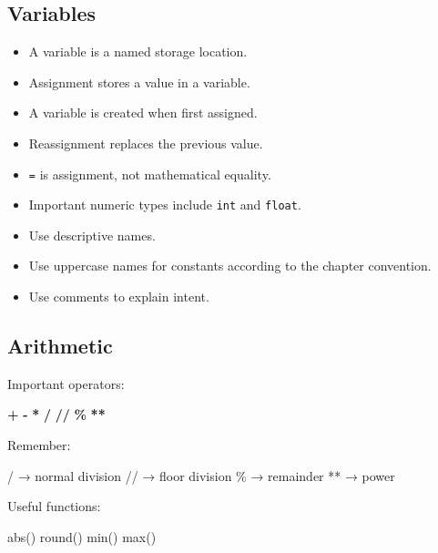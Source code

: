 \documentclass[
]{article}
\newenvironment{Shaded}{\begin{snugshade}}{\end{snugshade}}
\newcommand{\BuiltInTok}[1]{#1}
\newcommand{\NormalTok}[1]{#1}
\newcommand{\OperatorTok}[1]{\textcolor[rgb]{0.81,0.36,0.00}{\textbf{#1}}}
\providecommand{\tightlist}{%
  \setlength{\itemsep}{0pt}\setlength{\parskip}{0pt}}
\begin{document}
\subsection{Variables}\label{variables-1}

\begin{itemize}
\tightlist
\item
  A variable is a named storage location.
\item
  Assignment stores a value in a variable.
\item
  A variable is created when first assigned.
\item
  Reassignment replaces the previous value.
\item
  \texttt{=} is assignment, not mathematical equality.
\item
  Important numeric types include \texttt{int} and \texttt{float}.
\item
  Use descriptive names.
\item
  Use uppercase names for constants according to the chapter convention.
\item
  Use comments to explain intent.
\end{itemize}

\subsection{Arithmetic}\label{arithmetic-1}

Important operators:

\begin{Shaded}
\begin{Highlighting}[]
\OperatorTok{+}  \OperatorTok{{-}}  \OperatorTok{*}  \OperatorTok{/}  \OperatorTok{//}  \OperatorTok{\%}  \OperatorTok{**}
\end{Highlighting}
\end{Shaded}

Remember:

\begin{Shaded}
\begin{Highlighting}[]
\NormalTok{/   → normal division}
\NormalTok{//  → floor division}
\NormalTok{\%   → remainder}
\NormalTok{**  → power}
\end{Highlighting}
\end{Shaded}

Useful functions:

\begin{Shaded}
\begin{Highlighting}[]
\BuiltInTok{abs}\NormalTok{()}
\BuiltInTok{round}\NormalTok{()}
\BuiltInTok{min}\NormalTok{()}
\BuiltInTok{max}\NormalTok{()}
\end{Highlighting}
\end{Shaded}
\end{document}
